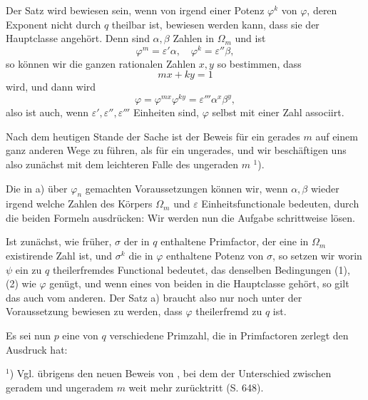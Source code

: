 
Der Satz wird bewiesen sein, wenn von irgend einer Potenz
$\varphi^k$ von $\varphi$, deren Exponent nicht durch $q$ theilbar
ist, bewiesen werden kann, dass sie der Hauptclasse angeh\"ort.
Denn sind $\alpha, \beta$ Zahlen in $\Omega_m$ und ist
\[
\varphi^m = \varepsilon' \alpha, \quad \varphi^k = \varepsilon'' \beta,
\]
so k\"onnen wir die ganzen rationalen Zahlen $x, y$ so bestimmen,
dass
\[
mx + ky = 1
\]
wird, und dann wird
\[
\varphi = \varphi^{mx} \varphi^{ky} = \varepsilon''' \alpha^x \beta^y,
\]
also ist auch, wenn $\varepsilon', \varepsilon'', \varepsilon'''$
Einheiten sind, $\varphi$ selbst mit einer Zahl associirt.

Nach dem heutigen Stande der Sache ist der Beweis f\"ur ein
gerades $m$ auf einem ganz anderen Wege zu f\"uhren, als f\"ur
ein ungerades, und wir besch\"aftigen uns also zun\"achst mit dem
leichteren Falle des ungeraden $m$ $^1$).

Die in a) \"uber $\varphi_n$ gemachten Voraussetzungen k\"onnen
wir, wenn $\alpha, \beta$ wieder irgend welche Zahlen des
K\"orpers $\Omega_m$ und $\varepsilon$ Einheitsfunctionale
bedeuten, durch die beiden Formeln ausdr\"ucken:
Wir werden nun die Aufgabe schrittweise l\"osen.

Ist zun\"achst, wie fr\"uher, $\sigma$ der in $q$ enthaltene
Primfactor, der eine in $\Omega_m$ existirende Zahl ist, und
$\sigma^k$ die in $\varphi$ enthaltene Potenz von $\sigma$, so
setzen wir
worin $\psi$ ein zu $q$ theilerfremdes Functional bedeutet, das
denselben Bedingungen (1), (2) wie $\varphi$ gen\"ugt, und wenn
eines von beiden in die Hauptclasse geh\"ort, so gilt das auch
vom anderen. Der Satz a) braucht also nur noch unter der
Voraussetzung bewiesen zu werden, dass $\varphi$ theilerfremd zu
$q$ ist.

Es sei nun $p$ eine von $q$ verschiedene Primzahl, die in
Primfactoren zerlegt den Ausdruck hat:

\noindent
$^1$) Vgl. \"ubrigens den neuen Beweis von , bei
dem der Unterschied zwischen geradem und ungeradem $m$ weit mehr
zur\"ucktritt (S. 648).
